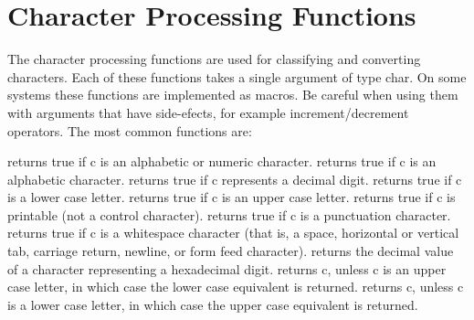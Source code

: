 \section{Character Processing Functions}
     The  character   processing  functions   are  used  for
classifying  and  converting characters. Each of these functions
takes a single argument of type {\cd char}.  On some systems these
functions are implemented as macros.  Be careful when using them with
arguments that have side-efects, for example increment/decrement
operators.  The most common functions
are:
\begin{hanglist}
          returns true if {\cd c} is an alphabetic or numeric
          character.
          returns true if {\cd c} is an alphabetic character.
          returns true if {\cd c} represents a decimal digit.
          returns true if {\cd c} is a lower case letter.
          returns true if {\cd c} is an upper case letter.
          returns true if {\cd c} is printable (not a control
		    character).
          returns true if {\cd c} is a punctuation character.
          returns true if {\cd c} is a whitespace character (that is,
          a space, horizontal or vertical tab, carriage return,
          newline, or form feed character).
          returns the decimal value of a character representing a
               hexadecimal digit.
          returns {\cd c},  unless {\cd c} is an upper case letter,
			 in which case the lower case equivalent is returned.
          returns {\cd c},  unless {\cd c} is a lower case letter,
			 in which case the upper case equivalent is returned.
\end{hanglist}

